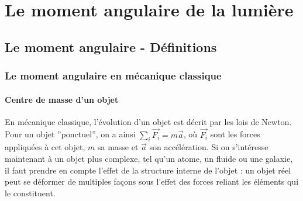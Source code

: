 \chapter{Le moment angulaire de la lumière}
\label{CH:OAM}

\section{Le moment angulaire - Définitions}
\subsection{Le moment angulaire en mécanique classique}
\subsubsection{Centre de masse d'un objet}

En mécanique classique, l'évolution d'un objet est décrit par les lois de Newton. Pour un objet ''ponctuel'', on a ainsi $\sum_i{\vec{F_i}}=m\vec{a}$, où $\vec{F_i}$ sont les forces appliquées à cet objet, $m$ sa masse et $\vec{a}$ son accélération. Si on s'intéresse maintenant à un objet plus complexe, tel qu'un atome, un fluide ou une galaxie, il faut prendre en compte l'effet de la structure interne de l'objet : un objet réel peut se déformer de multiples façons sous l'effet des forces reliant les éléments qui le constituent.

